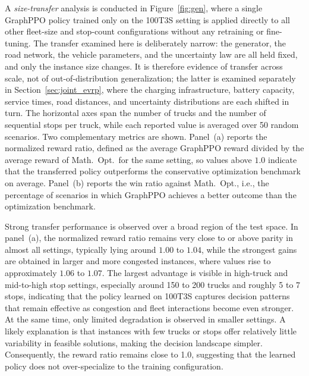 \documentclass[a4paper,fleqn]{cas-sc}
\begin{document}
A \emph{size-transfer} analysis is conducted in Figure~\ref{fig:gen}, where a single GraphPPO policy trained only on the 100T3S setting is applied directly to all other fleet-size and stop-count configurations without any retraining or fine-tuning. The transfer examined here is deliberately narrow: the generator, the road network, the vehicle parameters, and the uncertainty law are all held fixed, and only the instance size changes. It is therefore evidence of transfer across scale, not of out-of-distribution generalization; the latter is examined separately in Section~\ref{sec:joint_evrp}, where the charging infrastructure, battery capacity, service times, road distances, and uncertainty distributions are each shifted in turn. The horizontal axes span the number of trucks and the number of sequential stops per truck, while each reported value is averaged over 50 random scenarios. Two complementary metrics are shown. Panel~(a) reports the normalized reward ratio, defined as the average GraphPPO reward divided by the average reward of Math.\ Opt.\ for the same setting, so values above $1.0$ indicate that the transferred policy outperforms the conservative optimization benchmark on average. Panel~(b) reports the win ratio against Math.\ Opt., i.e., the percentage of scenarios in which GraphPPO achieves a better outcome than the optimization benchmark.

Strong transfer performance is observed over a broad region of the test space. In panel~(a), the normalized reward ratio remains very close to or above parity in almost all settings, typically lying around $1.00$ to $1.04$, while the strongest gains are obtained in larger and more congested instances, where values rise to approximately $1.06$ to $1.07$. The largest advantage is visible in high-truck and mid-to-high stop settings, especially around 150 to 200 trucks and roughly 5 to 7 stops, indicating that the policy learned on 100T3S captures decision patterns that remain effective as congestion and fleet interactions become even stronger.
At the same time, only limited degradation is observed in smaller settings. A likely explanation is that instances with few trucks or stops offer relatively little variability in feasible solutions, making the decision landscape simpler. Consequently, the reward ratio remains close to 1.0, suggesting that the learned policy does not over-specialize to the training configuration.
\end{document}
